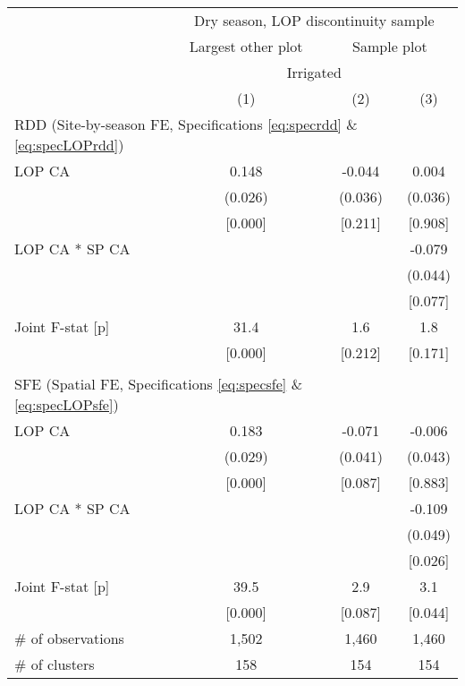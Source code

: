 \begin{tabular}{lccc}
\hline \hline
 & \multicolumn{3}{c}{Dry season, LOP discontinuity sample} \\
\cmidrule(lr){2-4}
 & Largest other plot & \multicolumn{2}{c}{Sample plot} \\
\cmidrule(lr){2-2}\cmidrule(lr){3-4}
 & \multicolumn{3}{c}{Irrigated} \\
\cmidrule(lr){2-4}
 & (1) & (2) & (3) \\
\hline
\multicolumn{3}{l}{RDD (Site-by-season FE, Specifications \ref{eq:specrdd} \& \ref{eq:specLOPrdd})} & \\
\cmidrule(lr){1-3}
LOP CA & 0.148 & -0.044\hphantom{-} & 0.004 \\
 & (0.026) & (0.036) & (0.036) \\
 & [0.000] & [0.211] & [0.908] \\
LOP CA * SP CA &  &  & -0.079\hphantom{-} \\
 &  &  & (0.044) \\
 &  &  & [0.077] \\
Joint F-stat [p] & 31.4 & 1.6 & 1.8 \\
 & [0.000] & [0.212] & [0.171] \\
\\[-0.5em]
\multicolumn{3}{l}{SFE (Spatial FE, Specifications \ref{eq:specsfe} \& \ref{eq:specLOPsfe})} & \\
\cmidrule(lr){1-3}
LOP CA & 0.183 & -0.071\hphantom{-} & -0.006\hphantom{-} \\
 & (0.029) & (0.041) & (0.043) \\
 & [0.000] & [0.087] & [0.883] \\
LOP CA * SP CA &  &  & -0.109\hphantom{-} \\
 &  &  & (0.049) \\
 &  &  & [0.026] \\
Joint F-stat [p] & 39.5 & 2.9 & 3.1 \\
 & [0.000] & [0.087] & [0.044] \\
\hline
\# of observations & 1,502 & 1,460 & 1,460 \\
\# of clusters & 158 & 154 & 154 \\
\hline
\end{tabular}
